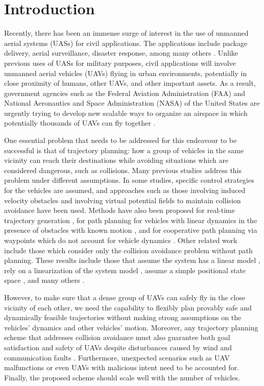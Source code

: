 \section{Introduction \label{sec:introduction}}
Recently, there has been an immense surge of interest in the use of unmanned aerial systems (UASs) for civil applications. The applications include package delivery, aerial surveillance, disaster response, among many others \cite{Tice91, Debusk10, Amazon16, AUVSI16, BBC16}. Unlike previous uses of UASs for military purposes, civil applications will involve unmanned aerial vehicles (UAVs) flying in urban environments, potentially in close proximity of humans, other UAVs, and other important assets. As a result, government agencies such as the Federal Aviation Administration (FAA) and National Aeronautics and Space Administration (NASA) of the United States are urgently trying to develop new scalable ways to organize an airspace in which potentially thousands of UAVs can fly together \cite{FAA13, Kopardekar16}.

One essential problem that needs to be addressed for this endeavour to be successful is that of trajectory planning: how a group of vehicles in the same vicinity can reach their destinations while avoiding situations which are considered dangerous, such as collisions. Many previous studies address this problem under different assumptions. In some studies, specific control strategies for the vehicles are assumed, and approaches such as those involving induced velocity obstacles \cite{Fiorini98, Chasparis05, Vandenberg08,Wu2012} and involving virtual potential fields to maintain collision avoidance \cite{Olfati-Saber2002, Chuang07} have been used. Methods have also been proposed for real-time trajectory generation \cite{Feng-LiLian2002}, for path planning for vehicles with linear dynamics in the presence of obstacles with known motion \cite{Ahmadzadeh2009}, and for cooperative path planning via waypoints which do not account for vehicle dynamics \cite{Bellingham}. Other related work include those which consider only the collision avoidance problem without path planning. These results include those that assume the system has a linear model \cite{Beard2003, Schouwenaars2004, Stipanovic2007}, rely on a linearization of the system model \cite{Massink2001, Althoff2011}, assume a simple positional state space \cite{Lin2015}, and many others \cite{Lalish2008, Hoffmann2008, Chen2016}.

However, to make sure that a dense group of UAVs can safely fly in the close vicinity of each other, we need the capability to flexibly plan provably safe and dynamically feasible trajectories without making strong assumptions on the vehicles' dynamics and other vehicles' motion. Moreover, any trajectory planning scheme that addresses collision avoidance must also guarantee both goal satisfaction and safety of UAVs despite disturbances caused by wind and communication faults \cite{Kopardekar16}. Furthermore, unexpected scenarios such as UAV malfunctions or even UAVs with malicious intent need to be accounted for. Finally, the proposed scheme should scale well with the number of vehicles.

